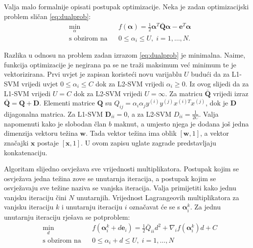 \documentclass[times, utf8, zavrsni, numeric]{fer}
\newcommand{\iteralpha}{\boldsymbol{\alpha}_i^{k}}
\begin{document}
\par Valja malo formalnije opisati postupak optimizacije.
Neka je zadan optimizacijski problem sličan \ref{eq:dualprob}:
\begin{equation} \label{eq:dualcdesc}
\begin{aligned}
& \underset{\alpha}{\text{min}}
& & f(\boldsymbol{\alpha}) = \frac{1}{2}\boldsymbol{\alpha}^T\bar{\textbf{Q}}\boldsymbol{\alpha} 
- \textbf{e}^T\boldsymbol{\alpha}\\
& \text{s obzirom na}
& & 0 \leq \alpha_i \leq U, \; i = 1, \ldots, N.
\end{aligned}
\end{equation}

Razlika u odnosu na problem zadan izrazom \ref{eq:dualprob} je minimalna. 
Naime, funkcija optimizacije je negirana pa se ne traži maksimum već minimum te je vektorizirana.
Prvi uvjet je zapisan koristeći novu varijablu $U$ budući da za L1-SVM vrijedi uvjet $0 \leq \alpha_i \leq C$
dok za L2-SVM vrijedi $\alpha_i \geq 0$. Iz ovog slijedi da za L1-SVM vrijedi $U=C$ dok za L2-SVM vrijedi
$U=\infty$. Za matricu $\bar{\textbf{Q}}$ vrijedi izraz $\bar{\textbf{Q}} = \textbf{Q} + \textbf{D}$.
Elementi matrice $\textbf{Q}$ su $Q_{ij} = \alpha_i\alpha_jy^{(i)}y^{(j)}x^{(i)T}x^{(j)}$, dok je
$\textbf{D}$ dijagonalna matrica. Za L1-SVM $\textbf{D}_{ii} = 0$, a za L2-SVM 
$D_{ii} = \frac{1}{2C}$. Valja napomenuti kako je slobodan član $b$ maknut, a umjesto njega je
dodana još jedna dimenzija vektoru težina $\textbf{w}$. 
Tada vektor težina ima oblik $[\textbf{w}, 1]$, a vektor značajki $\textbf{x}$ postaje $[\textbf{x}, 1]$.
U ovom zapisu uglate zagrade predstavljaju konkatenaciju.

\par Algoritam slijedno osvježava sve vrijednosti multiplikatora. Postupak kojim se osvježava jedna težina
zove se unutarnja iteracija, a postupak kojim se osvježavaju sve težine naziva se vanjska iteracija.
Valja primijetiti kako jednu vanjsku iteraciju čini $N$ unutarnjih.
Vrijednost Lagrangeovih multiplikatora za vanjsku iteraciju $k$ i unutarnju iteraciju $i$ označavat će se s
$\iteralpha$.
Za jednu unutarnju iteraciju rješava se potproblem:
\begin{equation} 
\begin{aligned}
& \underset{d}{\text{min}}
& & f(\iteralpha + d\textbf{e}_i) = \frac{1}{2}\bar{Q}_{ii}d^2 + 
\nabla_if(\iteralpha)d + C\\
& \text{s obzirom na}
& & 0 \leq \alpha_i + d \leq U, \; i = 1, \ldots, N
\end{aligned}
\end{equation}
\end{document}

